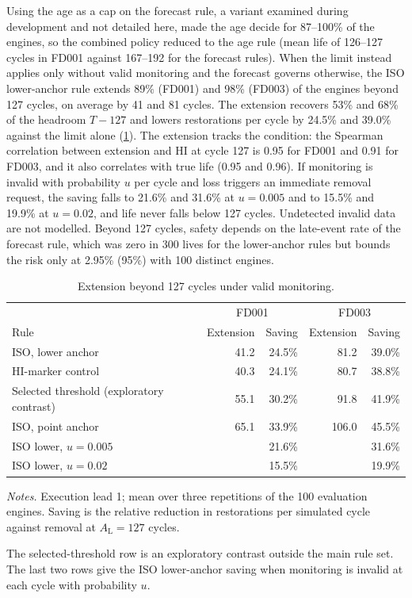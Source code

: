 \documentclass[preprint,12pt]{elsarticle}
\newcommand{\tablenotes}[1]{\par\smallskip\begin{minipage}{\linewidth}\footnotesize\raggedright\setlength{\parindent}{0pt}\setlength{\parskip}{0.35\baselineskip}\textit{Notes.} #1\end{minipage}}
\begin{document}
Using the age as a cap on the forecast rule, a variant examined during development and not detailed here, made the age decide for 87--100\% of the engines, so the combined policy reduced to the age rule (mean life of 126--127 cycles in FD001 against 167--192 for the forecast rules). When the limit instead applies only without valid monitoring and the forecast governs otherwise, the ISO lower-anchor rule extends 89\% (FD001) and 98\% (FD003) of the engines beyond 127 cycles, on average by 41 and 81 cycles. The extension recovers 53\% and 68\% of the headroom $T-127$ and lowers restorations per cycle by 24.5\% and 39.0\% against the limit alone (\cref{tab:extension}). The extension tracks the condition: the Spearman correlation between extension and HI at cycle 127 is 0.95 for FD001 and 0.91 for FD003, and it also correlates with true life (0.95 and 0.96). If monitoring is invalid with probability $u$ per cycle and loss triggers an immediate removal request, the saving falls to 21.6\% and 31.6\% at $u=0.005$ and to 15.5\% and 19.9\% at $u=0.02$, and life never falls below 127 cycles. Undetected invalid data are not modelled. Beyond 127 cycles, safety depends on the late-event rate of the forecast rule, which was zero in 300 lives for the lower-anchor rules but bounds the risk only at 2.95\% (95\%) with 100 distinct engines.

\begin{table}[htbp]
\centering
\caption{Extension beyond 127 cycles under valid monitoring.}
\label{tab:extension}
\footnotesize
\setlength{\tabcolsep}{3pt}
\begin{tabularx}{\linewidth}{@{}Xrrrr@{}}
\toprule
 & \multicolumn{2}{c}{FD001} & \multicolumn{2}{c}{FD003} \\
Rule & Extension & Saving & Extension & Saving \\
\midrule
ISO, lower anchor & 41.2 & 24.5\% & 81.2 & 39.0\% \\
HI-marker control & 40.3 & 24.1\% & 80.7 & 38.8\% \\
Selected threshold (exploratory contrast) & 55.1 & 30.2\% & 91.8 & 41.9\% \\
ISO, point anchor & 65.1 & 33.9\% & 106.0 & 45.5\% \\
\midrule
ISO lower, $u=0.005$ & & 21.6\% & & 31.6\% \\
ISO lower, $u=0.02$ & & 15.5\% & & 19.9\% \\
\bottomrule
\end{tabularx}
\tablenotes{Execution lead 1; mean over three repetitions of the 100 evaluation engines. Saving is the relative reduction in restorations per simulated cycle against removal at $A_{\mathrm L}=127$ cycles.

The selected-threshold row is an exploratory contrast outside the main rule set. The last two rows give the ISO lower-anchor saving when monitoring is invalid at each cycle with probability $u$.}
\end{table}
\end{document}
